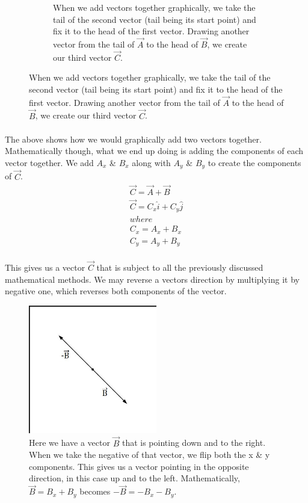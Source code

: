 \documentclass[12pt, letterpaper]{report}
\begin{document}
\begin{figure}[h]
\begin{subfigure}{0.45\textwidth}
			\caption{When we add vectors together graphically, we take the tail of the second vector (tail being its start point) and fix it to the head of the first vector. Drawing another vector from the tail of $\vec{A}$ to the head of $\vec{B}$, we create our third vector $\vec{C}$.}
			\end{subfigure}
		\end{figure}
		\paragraph{} The above shows how we would graphically add two vectors together. Mathematically though, what we end up doing is adding the components of each vector together. We add $A_x$ \& $B_x$ along with $A_y$ \& $B_y$ to create the components of $\vec{C}$. 
		\begin{align*}
		\vec{C} = \vec{A} + \vec{B}\\
		\vec{C} = C_x\hat{i} + C_y\hat{j}\\ where\\
		C_x = A_x + B_x\\
		C_y = A_y + B_y
		\end{align*}
		\paragraph{} This gives us a vector $\vec{C}$ that is subject to all the previously discussed mathematical methods. We may reverse a vectors direction by multiplying it by negative one, which reverses both components of the vector. 
		\begin{figure}[h]
		\centering
		\includegraphics[width=0.5\textwidth]{Processing Images/VectorAddition/NegVector.jpg}
		\caption{Here we have a vector $\vec{B}$ that is pointing down and to the right. When we take the negative of that vector, we flip both the x \& y components. This gives us a vector pointing in the opposite direction, in this case up and to the left. Mathematically, $\vec{B} = B_x + B_y$ becomes $-\vec{B} = -B_x - B_y$.}
		\end{figure}
\end{document}
